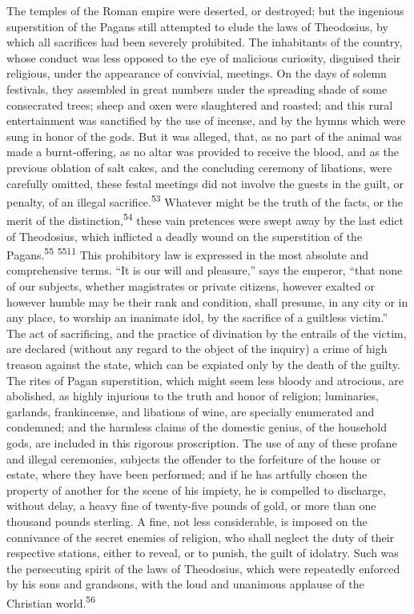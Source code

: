 The temples of the Roman empire were deserted, or destroyed; but
the ingenious superstition of the Pagans still attempted to elude
the laws of Theodosius, by which all sacrifices had been severely
prohibited. The inhabitants of the country, whose conduct was
less opposed to the eye of malicious curiosity, disguised their
religious, under the appearance of convivial, meetings. On the
days of solemn festivals, they assembled in great numbers under
the spreading shade of some consecrated trees; sheep and oxen
were slaughtered and roasted; and this rural entertainment was
sanctified by the use of incense, and by the hymns which were
sung in honor of the gods. But it was alleged, that, as no part
of the animal was made a burnt-offering, as no altar was provided
to receive the blood, and as the previous oblation of salt cakes,
and the concluding ceremony of libations, were carefully omitted,
these festal meetings did not involve the guests in the guilt, or
penalty, of an illegal sacrifice.\textsuperscript{53} Whatever might be the truth
of the facts, or the merit of the distinction,\textsuperscript{54} these vain
pretences were swept away by the last edict of Theodosius, which
inflicted a deadly wound on the superstition of the Pagans.\textsuperscript{55} \textsuperscript{5511}
This prohibitory law is expressed in the most absolute and
comprehensive terms. “It is our will and pleasure,” says the
emperor, “that none of our subjects, whether magistrates or
private citizens, however exalted or however humble may be their
rank and condition, shall presume, in any city or in any place,
to worship an inanimate idol, by the sacrifice of a guiltless
victim.” The act of sacrificing, and the practice of divination
by the entrails of the victim, are declared (without any regard
to the object of the inquiry) a crime of high treason against the
state, which can be expiated only by the death of the guilty. The
rites of Pagan superstition, which might seem less bloody and
atrocious, are abolished, as highly injurious to the truth and
honor of religion; luminaries, garlands, frankincense, and
libations of wine, are specially enumerated and condemned; and
the harmless claims of the domestic genius, of the household
gods, are included in this rigorous proscription. The use of any
of these profane and illegal ceremonies, subjects the offender to
the forfeiture of the house or estate, where they have been
performed; and if he has artfully chosen the property of another
for the scene of his impiety, he is compelled to discharge,
without delay, a heavy fine of twenty-five pounds of gold, or
more than one thousand pounds sterling. A fine, not less
considerable, is imposed on the connivance of the secret enemies
of religion, who shall neglect the duty of their respective
stations, either to reveal, or to punish, the guilt of idolatry.
Such was the persecuting spirit of the laws of Theodosius, which
were repeatedly enforced by his sons and grandsons, with the loud
and unanimous applause of the Christian world.\textsuperscript{56}

